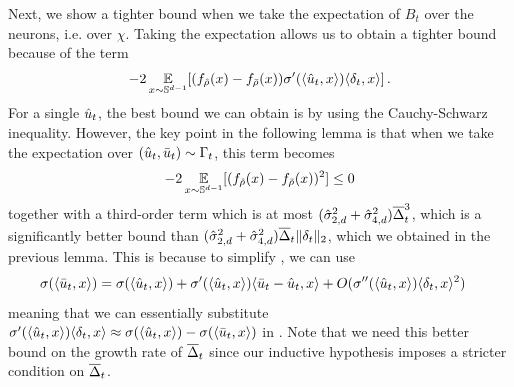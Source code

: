Next, we show a tighter bound when we take the expectation of $B_t$ over the neurons, i.e. over $\chi$. Taking the expectation allows us to obtain a tighter bound because of the term
\begin{align} \label{eq:bt_expectation_intuition}
-2 \operatorname*{\mathbb{E}}_{x \sim \mathbb{S}^{d - 1}} [(f_{{\hat{\rho}}}(x) - f_{{\bar{\rho}}}(x)) \sigma'(\langle \hat{u}_t, x \rangle) \langle \delta_t, x \rangle] \,.
\end{align}
For a single $\hat{u}_t$, the best bound we can obtain is by using the Cauchy-Schwarz inequality. However, the key point in the following lemma is that when we take the expectation over $(\hat{u}_t, \bar{u}_t) \sim \Gamma_t$, this term becomes
\begin{align}
-2 \operatorname*{\mathbb{E}}_{x \sim \mathbb{S}^{d - 1}} [(f_{{\hat{\rho}}}(x) - f_{{\bar{\rho}}}(x))^2] \leq 0
\end{align}
together with a third-order term which is at most $(\hat{\sigma}_{2, d}^2 + \hat{\sigma}_{4, d}^2) \overline{\Delta}_t^3$, which is a significantly better bound than $(\hat{\sigma}_{2, d}^2 + \hat{\sigma}_{4, d}^2) \overline{\Delta}_t \|\delta_t\|_2$, which we obtained in the previous lemma. This is because to simplify , we can use
\begin{align}
\sigma(\langle \bar{u}_t, x \rangle)
& = \sigma(\langle \hat{u}_t, x \rangle) + \sigma'(\langle \hat{u}_t, x \rangle) \langle \bar{u}_t - \hat{u}_t, x \rangle + O(\sigma''(\langle \hat{u}_t, x \rangle) \langle \delta_t, x \rangle^2 )
\end{align}
meaning that we can essentially substitute $\sigma'(\langle \hat{u}_t, x \rangle) \langle \delta_t, x \rangle \approx \sigma(\langle \hat{u}_t, x \rangle) - \sigma(\langle \bar{u}_t, x \rangle)$ in . Note that we need this better bound on the growth rate of $\overline{\Delta}_t$ since our inductive hypothesis imposes a stricter condition on $\overline{\Delta}_t$.

